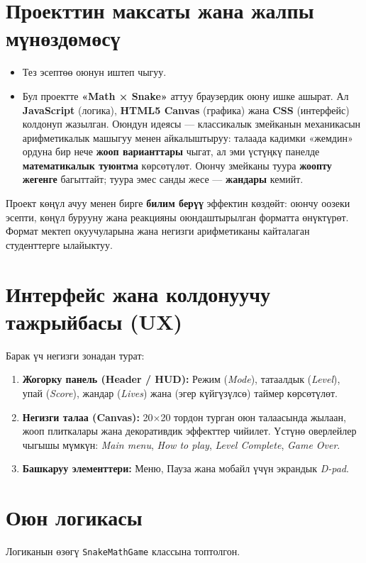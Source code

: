\documentclass{article}
\begin{document}
\section{Проекттин максаты жана жалпы мүнөздөмөсү}
\begin{itemize}
    \item Тез эсептөө оюнун иштеп чыгуу.
    \item Бул проектте \textbf{«Math × Snake»} аттуу браузердик оюну ишке ашырат. Ал \textbf{JavaScript} (логика), \textbf{HTML5 Canvas} (графика) жана \textbf{CSS} (интерфейс) колдонуп жазылган. Оюндун идеясы — классикалык змейканын механикасын арифметикалык машыгуу менен айкалыштыруу: талаада кадимки «жемдин» ордуна бир нече \textbf{жооп варианттары} чыгат, ал эми үстүңкү панелде \textbf{математикалык туюнтма} көрсөтүлөт. Оюнчу змейканы туура \textbf{жоопту жегенге} багыттайт; туура эмес санды жесе — \textbf{жандары} кемийт.
\end{itemize}

Проект көңүл ачуу менен бирге \textbf{билим берүү} эффектин көздөйт: оюнчу оозеки эсепти, көңүл бурууну жана реакцияны оюндаштырылган форматта өнүктүрөт. Формат мектеп окуучуларына жана негизги арифметиканы кайталаган студенттерге ылайыктуу.

\section{Интерфейс жана колдонуучу тажрыйбасы (UX)}
Барак үч негизги зонадан турат:
\begin{enumerate}
  \item \textbf{Жогорку панель (Header / HUD):} Режим (\textit{Mode}), татаалдык (\textit{Level}), упай (\textit{Score}), жандар (\textit{Lives}) жана (эгер күйгүзүлсө) таймер көрсөтүлөт.
  \item \textbf{Негизги талаа (Canvas):} 20×20 тордон турган оюн талаасында жылаан, жооп плиткалары жана декоративдик эффекттер чийилет. Үстүнө оверлейлер чыгышы мүмкүн: \textit{Main menu}, \textit{How to play}, \textit{Level Complete}, \textit{Game Over}.
  \item \textbf{Башкаруу элементтери:} Меню, Пауза жана мобайл үчүн экрандык \textit{D-pad}.
\end{enumerate}

\section{Оюн логикасы}
Логиканын өзөгү \texttt{SnakeMathGame} классына топтолгон.
\end{document}
